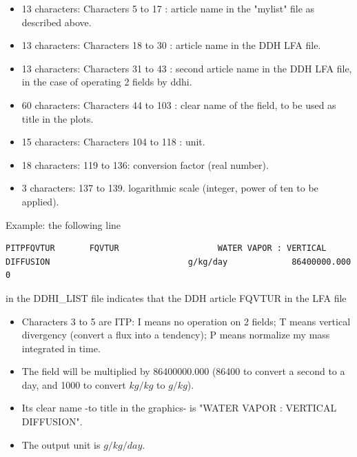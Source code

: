 \begin{itemize}
\begin{itemize}
      \item P: PPP (integrated in time mass field)
      \item M: PPP/time ; time is the DDH LFA "ECHEANCE" article.
      \item D: time (article ECHEANCE)
      \item V: time (article ECHEANCEDV)
      \item X: (PPP/time)/(-0.5*(Vxx0/VPP0+Vxx1/VPP1))
    \end{itemize}
  \item 13 characters: Characters 5 to 17 : article name in the "mylist" file as described above.
  \item 13 characters: Characters 18 to 30 : article name in the DDH LFA file.
  \item 13 characters: Characters 31 to 43 : second article name in the DDH LFA file, in the case of operating 2 fields by ddhi.
  \item 60 characters: Characters 44 to 103 : clear name of the field, to be used as title in the plots.
  \item 15 characters: Characters 104 to 118 : unit.
  \item 18 characters: 119 to 136: conversion factor (real number).
  \item 3 characters: 137 to 139. logarithmic scale (integer, power of ten to be applied).
\end{itemize}

\p Example: the following line
{\tiny \begin{verbatim} 
PITPFQVTUR       FQVTUR                    WATER VAPOR : VERTICAL DIFFUSION                            g/kg/day             86400000.000  0
\end{verbatim}}
\noi in the DDHI\_LIST file indicates that the DDH article FQVTUR in the LFA file
\begin{itemize}
  [label=\textbullet]
  \item Characters 3 to 5 are ITP: I means no operation on 2 fields; T means vertical divergency (convert a flux into a tendency); P means normalize my mass integrated in time.
  \item The field will be multiplied by 86400000.000 (86400 to convert a second to a day, and 1000 to convert $kg/kg$ to $g/kg$).
  \item Its clear name -to title in the graphics- is "WATER VAPOR : VERTICAL DIFFUSION".
  \item The output unit is $g/kg/day$.
\end{itemize}

